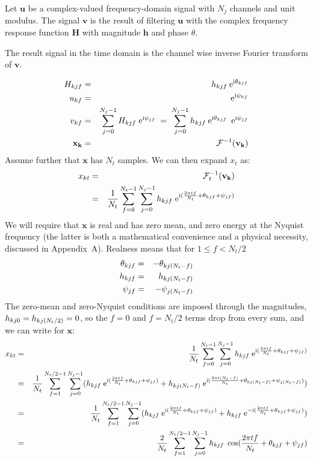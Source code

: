 \documentclass[10pt,a4paper]{article}
\numberwithin{equation}{section}
\DeclarePairedDelimiter\mat{(}{)}
\newcommand{\m}[1]{\mathrm{#1}}
\begin{document}
Let $\mathbf{u}$ be a complex-valued frequency-domain signal with $N_j$ channels and unit modulus. The signal $\mathbf{v}$ is the result of filtering $\mathbf{u}$ with the complex frequency response function $\mathbf{H}$ with magnitude $\mathbf{h}$ and phase $\theta$.

The result signal in the time domain is the channel wise inverse Fourier transform of $\mathbf{v}$.

\begin{eqnarray}
	H_{k j f} &=& h_{k j f} \: \m{e}^{\m{i} \theta_{k j f}} \\
	u_{k f} &=& \m{e}^{\m{i} \psi_{k f}} \\
	v_{k f} &=& \sum_{j=0}^{N_j-1} H_{k j f} \; \m{e}^{\m{i} \psi_{j f}} 
			\;=\; \sum_{j=0}^{N_j-1} h_{k j f} \: \m{e}^{\m{i} \theta_{k j f}} \:\; \m{e}^{\m{i} \psi_{j f}} \\
	\mathbf{x_k} &=& \mathcal{F}^{\m{-1}} \mat{\mathbf{v_k}}
\end{eqnarray}
Assume further that $\mathbf{x}$ has $N_t$ samples. We can then expand $x_t$ as:
\begin{eqnarray}
	x_{k t}
	&=& \mathcal{F}^{\m{-1}}_t \mat{\mathbf{v_k}} \\
	&=&  \frac{1}{N_t} \sum_{f=0}^{N_t-1}
\sum_{j=0}^{N_j-1} h_{k j f} \; \m{e}^{\m{i}\mat{\frac{2 \pi t f}{N_t} + \theta_{k j f} + \psi_{j f}}} 
\end{eqnarray}
We will require that $\mathbf{x}$ is real and has zero mean, and zero energy at the Nyquist frequency (the latter is both a mathematical convenience and a physical necessity, discussed in Appendix~A). Realness means that for $1 \leq f < N_t/2$
\begin{eqnarray}
	\theta_{k j f} &=& - \theta_{k j \mat{N_t  - f}} \\
	h_{k j f} &=& h_{k j \mat{N_t  - f}} \\
	\psi_{j f} &=& - \psi_{j \mat{N_t  - f}}
\end{eqnarray}
The zero-mean and zero-Nyquist conditions are imposed through the magnitudes, $h_{k j 0} = h_{k j \mat{N_t/2}} = 0$, so the $f = 0$ and $f = N_t/2$ terms drop from every sum, and we can write for $\mathbf{x}$:
\begin{eqnarray}
	x_{k t}
	&=&  \frac{1}{N_t} \sum_{f=0}^{N_t-1}
		\sum_{j=0}^{N_j-1} h_{k j f} \; \m{e}^{\m{i}\mat{\frac{2 \pi t f}{N_t} + \theta_{k j f} + \psi_{j f}}} \\
	&=&  \frac{1}{N_t} \sum_{f=1}^{N_t/2-1}
		\sum_{j=0}^{N_j-1} 
		\mat{h_{k j f} \; \m{e}^{\m{i}\mat{\frac{2 \pi t f}{N_t} + \theta_{k j f} + \psi_{j f}}}			
		+ h_{k j \mat{N_t - f}} \; \m{e}^{\m{i}\mat{\frac{2 \pi t \mat{N_t - f}}{N_t} + \theta_{k j \mat{N_t - f}} + \psi_{j \mat{N_t - f}}}}} \\
	&=&  \frac{1}{N_t} \sum_{f=1}^{N_t/2 - 1}
		\sum_{j=0}^{N_j-1} 
		\mat{h_{k j f} \; \m{e}^{\m{i}\mat{\frac{2 \pi t f}{N_t} + \theta_{k j f} + \psi_{j f}}}
	    + h_{k j f} \; \m{e}^{-\m{i}\mat{\frac{2 \pi t f}{N_t} + \theta_{k j f} + \psi_{j f}}}} \\	
	&=&	\frac{2}{N_t} \sum_{f=1}^{N_t/2 - 1}
		\sum_{j=0}^{N_j-1} h_{k j f} \; \cos\mat{\frac{2 \pi t f}{N_t} + \theta_{k j f} + \psi_{j f}} \\
\end{eqnarray}
\end{document}
